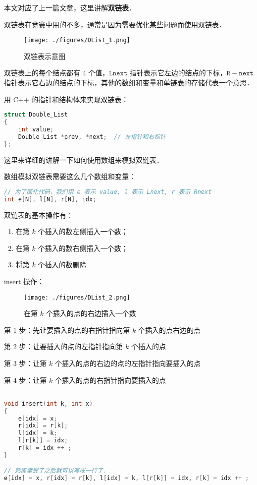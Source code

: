 
本文对应了上一篇文章，这里讲解\textbf{双链表}．

双链表在竞赛中用的不多，通常是因为需要优化某些问题而使用双链表．

\begin{figure}[ht]
\centering
\texttt{[image: ./figures/DList\_1.png]}
\caption{双链表示意图} \label{DList_fig1}
\end{figure}

双链表上的每个结点都有 $4$ 个值，$\mathtt{Lnext}$ 指针表示它左边的结点的下标，$\mathtt{R-next}$ 指针表示它右边的结点的下标，其他的数组和变量和单链表的存储代表一个意思．

用 C++ 的指针和结构体来实现双链表：
\begin{lstlisting}[language=cpp]
struct Double_List
{
    int value;
    Double_List *prev, *next;  // 左指针和右指针
};
\end{lstlisting}

这里来详细的讲解一下如何使用数组来模拟双链表．

数组模拟双链表需要这么几个数组和变量：
\begin{lstlisting}[language=cpp]
// 为了简化代码，我们用 e 表示 value, l 表示 Lnext, r 表示 Rnext
int e[N], l[N], r[N], idx;
\end{lstlisting}

双链表的基本操作有：\begin{enumerate}
\item 在第 $k$ 个插入的数左侧插入一个数；
\item 在第 $k$ 个插入的数右侧插入一个数；
\item 将第 $k$ 个插入的数删除
\end{enumerate}

$\text{insert}$ 操作：

\begin{figure}[ht]
\centering
\texttt{[image: ./figures/DList\_2.png]}
\caption{在第 $k$ 个插入的点的右边插入一个数} \label{DList_fig2}
\end{figure}

第 $1$ 步：先让要插入的点的右指针指向第 $k$ 个插入的点右边的点

第 $2$ 步：让要插入的点的左指针指向第 $k$ 个插入的点

第 $3$ 步：让第 $k$ 个插入的点的右边的点的左指针指向要插入的点

第 $4$ 步：让第 $k$ 个插入的点的右指针指向要插入的点


\begin{lstlisting}[language=cpp]

void insert(int k, int x)
{
    e[idx] = x;
    r[idx] = r[k];
    l[idx] = k;
    l[r[k]] = idx;
    r[k] = idx ++ ;
}

// 熟练掌握了之后就可以写成一行了．
e[idx] = x, r[idx] = r[k], l[idx] = k, l[r[k]] = idx, r[k] = idx ++ ;



\end{lstlisting}

